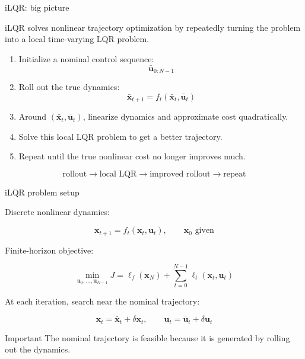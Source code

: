 \documentclass[aspectratio=169]{beamer}
\begin{document}
\begin{frame}[t]{iLQR: big picture}
\large

iLQR solves nonlinear trajectory optimization by repeatedly turning the problem into a local time-varying LQR problem.

\vspace{0.25cm}

\begin{enumerate}
    \item Initialize a nominal control sequence:
    \[
    \bar{\bm{u}}_{0:N-1}
    \]
    \item Roll out the true dynamics:
    \[
    \bar{\bm{x}}_{t+1}=f_t(\bar{\bm{x}}_t,\bar{\bm{u}}_t)
    \]
    \item Around $(\bar{\bm{x}}_t,\bar{\bm{u}}_t)$, linearize dynamics and approximate cost quadratically.
    \item Solve this local LQR problem to get a better trajectory.
    \item Repeat until the true nonlinear cost no longer improves much.
\end{enumerate}

\vspace{0.15cm}

\[
\text{rollout}
\rightarrow
\text{local LQR}
\rightarrow
\text{improved rollout}
\rightarrow
\text{repeat}
\]

\end{frame}

\begin{frame}[t]{iLQR problem setup}
\large

Discrete nonlinear dynamics:

\[
\bm{x}_{t+1}=f_t(\bm{x}_t,\bm{u}_t),
\qquad
\bm{x}_0 \text{ given}
\]

Finite-horizon objective:

\[
\min_{\bm{u}_0,\ldots,\bm{u}_{N-1}}
J
=
\ell_f(\bm{x}_N)
+
\sum_{t=0}^{N-1}\ell_t(\bm{x}_t,\bm{u}_t)
\]

\vspace{0.2cm}

At each iteration, search near the nominal trajectory:

\[
\bm{x}_t=\bar{\bm{x}}_t+\delta\bm{x}_t,
\qquad
\bm{u}_t=\bar{\bm{u}}_t+\delta\bm{u}_t
\]

\begin{block}{Important}
The nominal trajectory is feasible because it is generated by rolling out the dynamics.
\end{block}

\end{frame}
\end{document}
